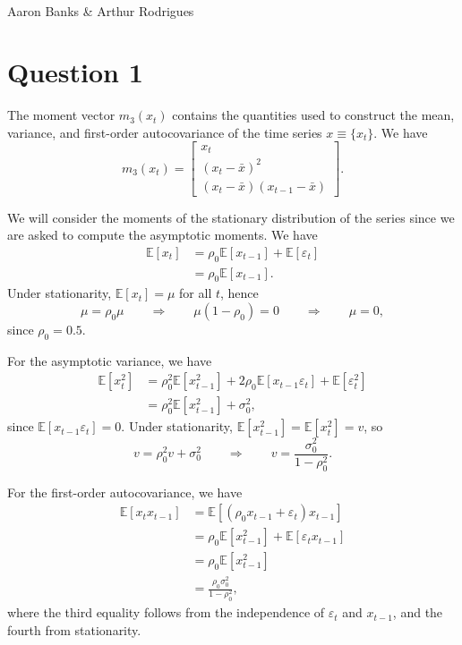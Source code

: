 \documentclass{article}
\begin{document}
    \begin{center}
        \\
        Aaron Banks \& Arthur Rodrigues
    \end{center}

\section*{Question 1}

The moment vector $m_3(x_t)$ contains the quantities used to
construct the mean, variance, and first-order autocovariance of
the time series $x \equiv \{x_t\}$. We have
\[
    m_3(x_t)
    =
    \begin{bmatrix}
        x_t\\
        (x_t-\bar{x})^2\\
        (x_t-\bar{x})(x_{t-1}-\bar{x})
    \end{bmatrix}.
\]

We will consider the moments of the stationary distribution of the
series since we are asked to compute the asymptotic moments.
We have
\begin{align*}
    \mathbb{E}[x_t]
    &= \rho_0 \mathbb{E}[x_{t-1}]
    + \mathbb{E}[\varepsilon_t]\\
    &= \rho_0 \mathbb{E}[x_{t-1}].
\end{align*}
Under stationarity, $\mathbb{E}[x_t]=\mu$ for all $t$, hence
\[
    \mu = \rho_0\mu
    \qquad \Rightarrow \qquad
    \mu(1-\rho_0)=0
    \qquad \Rightarrow \qquad
    \mu=0,
\]
since $\rho_0=0.5$.

For the asymptotic variance, we have
\begin{align*}
    \mathbb{E}[x_t^2]
    &= \rho_0^2\mathbb{E}[x_{t-1}^2]
    + 2\rho_0\mathbb{E}[x_{t-1}\varepsilon_t]
    + \mathbb{E}[\varepsilon_t^2]\\
    &= \rho_0^2\mathbb{E}[x_{t-1}^2]+\sigma_0^2,
\end{align*}
since $\mathbb{E}[x_{t-1}\varepsilon_t]=0$.
Under stationarity,
$\mathbb{E}[x_{t-1}^2]=\mathbb{E}[x_t^2]=v$, so
\[
    v=\rho_0^2v+\sigma_0^2
    \qquad \Rightarrow \qquad
    v=\frac{\sigma_0^2}{1-\rho_0^2}.
\]

For the first-order autocovariance, we have
\begin{align*}
    \mathbb{E}[x_tx_{t-1}]
    &= \mathbb{E}[
        (\rho_0x_{t-1}+\varepsilon_t)x_{t-1}
    ]\\
    &= \rho_0\mathbb{E}[x_{t-1}^2]
    + \mathbb{E}[\varepsilon_tx_{t-1}]\\
    &= \rho_0\mathbb{E}[x_{t-1}^2]\\
    &= \frac{\rho_0\sigma_0^2}{1-\rho_0^2},
\end{align*}
where the third equality follows from the independence of
$\varepsilon_t$ and $x_{t-1}$, and the fourth from stationarity.
\end{document}
